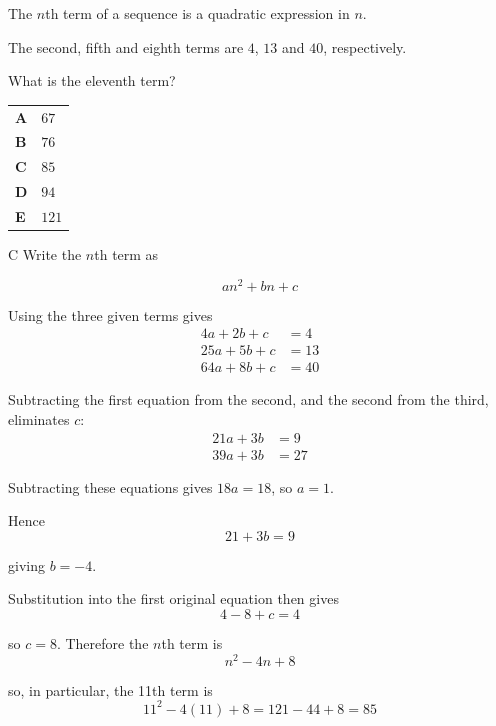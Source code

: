 \documentclass[11pt,a4paper]{article}
\begin{document}
\begin{enumerate}[label=\textbf{\arabic*.},leftmargin=*,itemsep=0pt,start=8]
The $n$th term of a sequence is a quadratic expression in $n$. 

The second, fifth and eighth terms are $4$, $13$ and $40$, respectively. 

What is the eleventh term?

\par\vspace*{12pt}
\begin{tabularx}{\linewidth}{@{}>{\bfseries}l Y@{}}
A &
$67$
\\[0.8em]
B &
$76$
\\[0.8em]
C &
$85$
\\[0.8em]
D &
$94$
\\[0.8em]
E &
$121$
\\
\end{tabularx}

\begin{djsSolution}{C}
Write the $n$th term as

\[
an^2+bn+c
\]

Using the three given terms gives
\[
\begin{aligned}
4a+2b+c&=4 \\[2pt]
25a+5b+c&=13 \\[2pt]
64a+8b+c&=40
\end{aligned}
\]

Subtracting the first equation from the second, and the second from the third, eliminates $c$:
\[
\begin{aligned}
21a+3b&=9 \\[2pt]
39a+3b&=27
\end{aligned}
\]

Subtracting these equations gives $18a=18$, so $a=1$. 

Hence \[21+3b=9\]

giving $b=-4$. 

Substitution into the first original equation then gives
\[
4-8+c=4
\]

so $c=8$. Therefore the $n$th term is 
\[n^2-4n+8\]

so, in particular, the 11th term is
\[
11^2-4(11)+8=121-44+8=85
\]


\end{djsSolution}
\end{enumerate}
\end{document}
